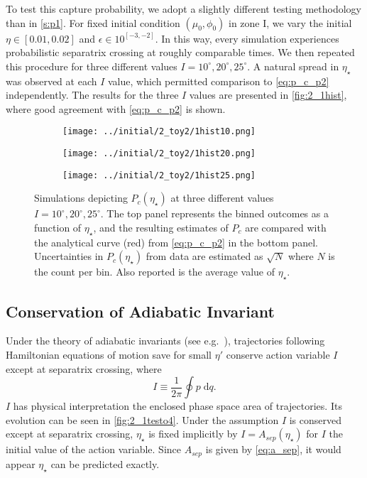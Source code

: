 \documentclass[
        fleqn,
        usenatbib,
    ]{mnras}
\begin{document}
To test this capture probability, we adopt a slightly different testing
methodology than in \autoref{s:p1}. For fixed initial condition $(\mu_0,
\phi_0)$ in zone I, we vary the initial $\eta \in [0.01, 0.02]$ and $\epsilon
\in 10^{[-3, -2]}$. In this way, every simulation experiences probabilistic
separatrix crossing at roughly comparable times. We then repeated this procedure
for three different values $I = 10^\circ, 20^\circ, 25^\circ$. A natural spread
in $\eta_\star$ was observed at each $I$ value, which permitted comparison to
\autoref{eq:p_c_p2} independently. The results for the three $I$ values are
presented in \autoref{fig:2_1hist}, where good agreement with
\autoref{eq:p_c_p2} is shown.
\begin{figure}
    \centering
    \begin{subfigure}{\columnwidth}
        \centering
        \texttt{[image: ../initial/2\_toy2/1hist10.png]}
    \end{subfigure}

    \begin{subfigure}{\columnwidth}
        \centering
        \texttt{[image: ../initial/2\_toy2/1hist20.png]}
    \end{subfigure}

    \begin{subfigure}{\columnwidth}
        \centering
        \texttt{[image: ../initial/2\_toy2/1hist25.png]}
    \end{subfigure}
    \caption{Simulations depicting $P_c(\eta_\star)$ at three different values
    $I = 10^\circ, 20^\circ, 25^\circ$. The top panel represents the binned
    outcomes as a function of $\eta_\star$, and the resulting estimates of $P_c$
    are compared with the analytical curve (red) from \autoref{eq:p_c_p2} in the
    bottom panel. Uncertainties in $P_c(\eta_\star)$ from data are estimated as
    $\sqrt{N}$ where $N$ is the count per bin. Also reported is the average
    value of $\eta_\star$.}\label{fig:2_1hist}
\end{figure}

\subsection{Conservation of Adiabatic Invariant}\label{ss:noncons}

Under the theory of adiabatic invariants (see e.g.\ \cite{henrard1982,
l_and_l}), trajectories following Hamiltonian equations of motion save for small
$\eta'$ conserve action variable $I$ except at separatrix crossing, where
\begin{equation}
    I \equiv \frac{1}{2\pi}\oint p\;\mathrm{d}q.
\end{equation}
$I$ has physical interpretation the enclosed phase space area of trajectories.
Its evolution can be seen in \autoref{fig:2_1testo4}. Under the assumption $I$
is conserved except at separatrix crossing, $\eta_\star$ is fixed implicitly by
$I = A_{sep}(\eta_\star)$ for $I$ the initial value of the action variable.
Since $A_{sep}$ is given by \autoref{eq:a_sep}, it would appear $\eta_\star$ can
be predicted exactly.
\end{document}
